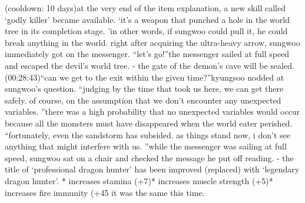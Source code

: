 (cooldown: 10 days)at the very end of the item explanation, a new skill called ‘godly killer’ became available.
‘it’s a weapon that punched a hole in the world tree in its completion stage.
’in other words, if sungwoo could pull it, he could break anything in the world.
right after acquiring the ultra-heavy arrow, sungwoo immediately got on the messenger.
“let’s go!”the messenger sailed at full speed and escaped the devil’s world tree.
- the gate of the demon’s cave will be sealed.
 (00:28:43)“can we get to the exit within the given time?”kyungsoo nodded at sungwoo’s question.
“judging by the time that took us here, we can get there safely.
 of course, on the assumption that we don’t encounter any unexpected variables.
”there was a high probability that no unexpected variables would occur because all the monsters must have disappeared when the world eater perished.
“fortunately, even the sandstorm has subsided.
 as things stand now, i don’t see anything that might interfere with us.
”while the messenger was sailing at full speed, sungwoo sat on a chair and checked the message he put off reading.
- the title of ‘professional dragon hunter’ has been improved (replaced) with ‘legendary dragon hunter’.
* increases stamina (+7)* increases muscle strength (+5)* increases fire immunity (+45%
 it was the same this time.


